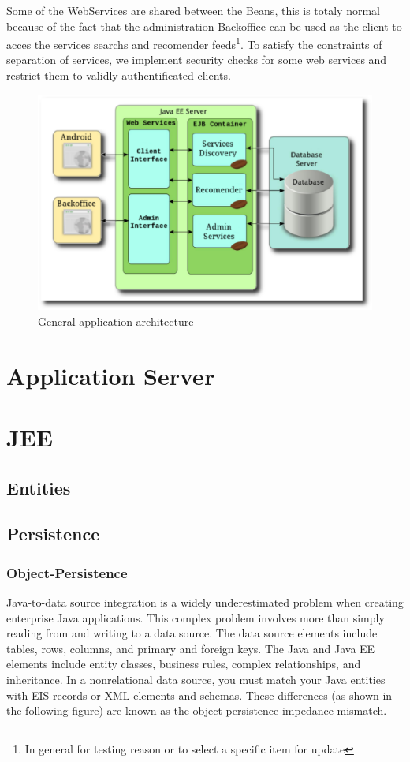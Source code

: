 Some of the WebServices are shared between the Beans, this is totaly normal
because of the fact that the administration Backoffice can be used as the client
to acces the services searchs and recomender feeds\footnote{In general for
testing reason or to select a specific item for update}. To satisfy the
constraints of separation of services, we implement security checks for some web
services and restrict them to validly authentificated
clients.

\begin{figure}[!htb]
  \begin{center}
  \includegraphics[scale=0.6]{Figures/Architecture_of_HyperPath_Application.eps}
  \end{center}
  \caption{General application architecture}
  \label{General application architecture}
\end{figure}

\section{Application Server}

\section{JEE}
\subsection{Entities}
\subsection{Persistence}
\subsubsection{Object-Persistence}
Java-to-data source integration is a widely underestimated problem when creating
enterprise Java applications. This complex problem involves more than simply
reading from and writing to a data source. The data source elements include
tables, rows, columns, and primary and foreign keys. The Java and Java EE
elements include entity classes, business rules, complex relationships, and
inheritance. In a nonrelational data source, you must match your Java entities
with EIS records or XML elements and schemas. These differences (as shown in the
following figure) are known as the object-persistence impedance mismatch.

